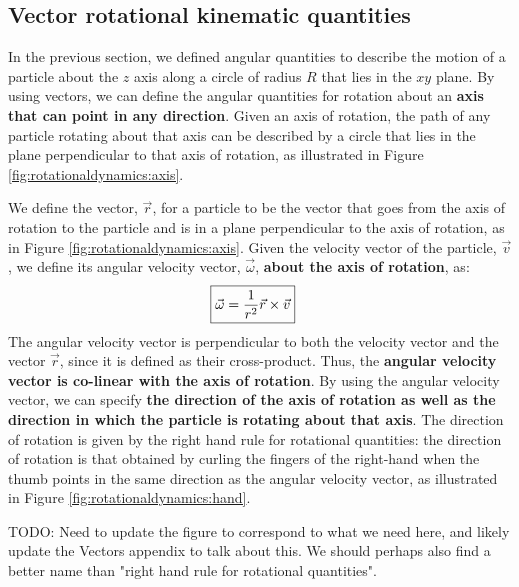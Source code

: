 \subsection{Vector rotational kinematic quantities}
In the previous section, we defined angular quantities to describe the motion of a particle about the $z$ axis along a circle of radius $R$ that lies in the $xy$ plane. By using vectors, we can define the angular quantities for rotation about an \textbf{axis that can point in any direction}. Given an axis of rotation, the path of any particle rotating about that axis can be described by a circle that lies in the plane perpendicular to that axis of rotation, as illustrated in Figure \ref{fig:rotationaldynamics:axis}.

We define the vector, $\vec r$, for a particle to be the vector that goes from the axis of rotation to the particle and is in a plane perpendicular to the axis of rotation, as in Figure \ref{fig:rotationaldynamics:axis}. Given the velocity vector of the particle, $\vec v$, we define its angular velocity vector, $\vec\omega$, \textbf{about the axis of rotation}, as:
\begin{align}
\Aboxed{\vec \omega = \frac{1}{r^2} \vec r \times \vec v}
\end{align}
The angular velocity vector is perpendicular to both the velocity vector and the vector $\vec r$, since it is defined as their cross-product. Thus, the \textbf{angular velocity vector is co-linear with the axis of rotation}. By using the angular velocity vector, we can specify \textbf{the direction of the axis of rotation as well as the direction in which the particle is rotating about that axis}. The direction of rotation is given by the right hand rule for rotational quantities: the direction of rotation is that obtained by curling the fingers of the right-hand when the thumb points in the same direction as the angular velocity vector, as illustrated in Figure \ref{fig:rotationaldynamics:hand}.

TODO: Need to update the figure to correspond to what we need here, and likely update the Vectors appendix to talk about this. We should perhaps also find a better name than "right hand rule for rotational quantities".

